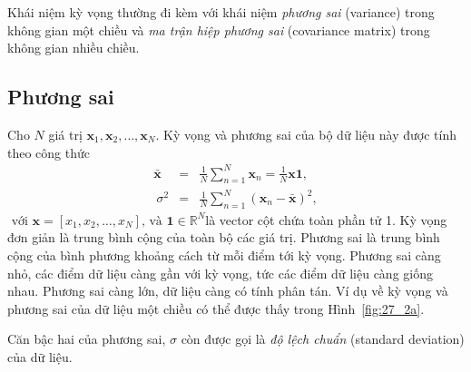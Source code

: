 \documentclass[12pt,a4paper,oneside]{report}
\numberwithin{equation}{section}
\begin{document}

Khái niệm kỳ vọng thường đi kèm với khái niệm \textit{phương
	sai} (variance) trong không gian một chiều và \textit{ma trận hiệp
	phương sai} (covariance matrix) trong không gian nhiều chiều. 

\subsection{Phương sai} %

Cho $N$ giá trị $\mathbf{x}_1, \mathbf{x}_2, \dots, \mathbf{x}_N$. {Kỳ vọng} và {phương sai}
của bộ dữ liệu này được tính theo công thức
\begin{eqnarray} 
	\bar{\mathbf{x}} &=& \frac{1}{N}\sum_{n=1}^N \mathbf{x}_n = \frac{1}{N}\mathbf{x1},\\\ 
	\sigma^2 &=& \frac{1}{N} \sum_{n=1}^N (\mathbf{x}_n - \bar{\mathbf{x}})^2,
\end{eqnarray} 
$\text { với } \mathbf{x}=\left[x_1, x_2, \ldots, x_N\right] \text {, và } \mathbf{1} \in \mathbb{R}^N$là
vector cột chứa toàn phần tử 1. Kỳ vọng đơn giản là trung bình cộng của toàn bộ
các giá trị. Phương sai là trung bình cộng của bình phương khoảng cách từ mỗi
điểm tới kỳ vọng. Phương sai càng nhỏ, các điểm dữ liệu càng gần với kỳ vọng,
tức các điểm dữ liệu càng giống nhau. Phương sai càng lớn, dữ liệu càng có tính
phân tán. Ví dụ về kỳ vọng và phương sai của dữ liệu một chiều có thể được thấy
trong Hình~\ref{fig:27_2a}. 

Căn bậc hai của phương sai, $\sigma$ còn được gọi là \textit{độ lệch chuẩn} (standard deviation) của
dữ liệu.
\end{document}
